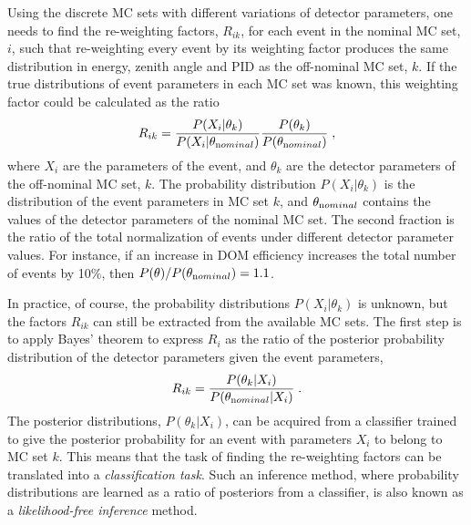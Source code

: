 Using the discrete MC sets with different variations of detector parameters, one needs to find the re-weighting factors, $R_{ik}$, for each event in the nominal MC set, $i$, such that re-weighting every event by its weighting factor produces the same distribution in energy, zenith angle and PID as the off-nominal MC set, $k$. If the true distributions of event parameters in each MC set was known, this weighting factor could be calculated as the ratio
\begin{equation}
    R_{ik} = \frac{P(X_i|\theta_k)}{P(X_i|\theta_{\rm nominal})} \frac{P(\theta_k)}{P(\theta_{\rm nominal})}\;, \label{eq:ratio-likelihood}
\end{equation}
where $X_i$ are the parameters of the event, and $\theta_k$ are the detector parameters of the off-nominal MC set, $k$. The probability distribution $P(X_i|\theta_k)$ is the distribution of the event parameters in MC set $k$, and $\theta_{\rm nominal}$ contains the values of the detector parameters of the nominal MC set. The second fraction is the ratio of the total normalization of events under different detector parameter values. For instance, if an increase in DOM efficiency increases the total number of events by 10\%, then $P(\theta) / P(\theta_{\rm nominal}) = 1.1$.

In practice, of course, the probability distributions $P(X_i|\theta_k)$ is unknown, but the factors $R_{ik}$  can still be extracted from the available MC sets.
The first step is to apply Bayes' theorem to express $R_i$ as the ratio of the posterior probability distribution of the detector parameters given the event parameters,
\begin{equation}
    R_{ik} = \frac{P(\theta_k|X_i)}{P(\theta_{\rm nominal}|X_i)}\;. \label{eq:ratio-posterior}
\end{equation}
The posterior distributions, $P(\theta_k|X_i)$, can be acquired from a classifier trained to give the posterior probability for an event with parameters $X_i$ to belong to MC set $k$. This means that the task of finding the re-weighting factors can be translated into a \emph{classification task}. Such an inference method, where probability distributions are learned as a ratio of posteriors from a classifier, is also known as a \emph{likelihood-free inference} method.

